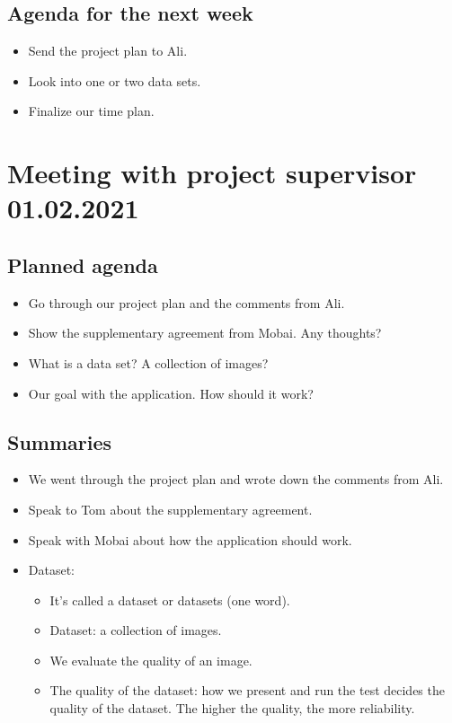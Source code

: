 \subsection*{Agenda for the next week}
\begin{itemize}
    \item Send the project plan to Ali.
    \item Look into one or two data sets.
    \item Finalize our time plan.
\end{itemize}



\section*{Meeting with project supervisor 01.02.2021}
\subsection*{Planned agenda}
\begin{itemize}
    \item Go through our project plan and the comments from Ali.
    \item Show the supplementary agreement from Mobai. Any thoughts?
    \item What is a data set? A collection of images?
    \item Our goal with the application. How should it work?
\end{itemize}

\subsection*{Summaries}
\begin{itemize}
    \item We went through the project plan and wrote down the comments from Ali.
    \item Speak to Tom about the supplementary agreement.
    \item Speak with Mobai about how the application should work. 
    \item Dataset:
    \begin{itemize}
        \item It’s called a dataset or datasets (one word). \item Dataset: a collection of images.
        \item We evaluate the quality of an image.
        \item The quality of the dataset: how we present and run the test decides the quality of the dataset. The higher the quality, the more reliability.
    \end{itemize}
\end{itemize}

